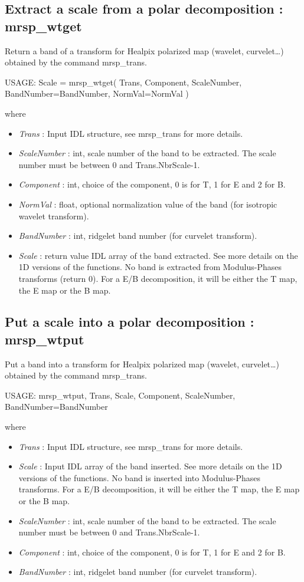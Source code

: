 \subsection{Extract a scale from a polar decomposition : mrsp\_wtget}
Return a band of a transform for Healpix polarized map (wavelet, curvelet\ldots) obtained by the command mrsp\_trans.
{\bf
\begin{center}
     USAGE:  Scale = mrsp\_wtget( Trans, Component, ScaleNumber, BandNumber=BandNumber, NormVal=NormVal )
\end{center}}
where
\begin{itemize}
\item {\em Trans} : Input IDL structure, see mrsp\_trans for more details.
\item {\em ScaleNumber} : int, scale number of the band to be extracted. The scale number must be between 0 and Trans.NbrScale-1.
\item {\em Component} : int, choice of the component, 0 is for T, 1 for E and 2 for B.
\item {\em NormVal} : float, optional normalization value of the band (for isotropic wavelet transform).
\item {\em BandNumber} : int, ridgelet band number (for curvelet transform).
\item {\em Scale} : return value IDL array of the band extracted. See more details on the 1D versions of the functions. 
No band is extracted from Modulus-Phases transforms (return 0). For a E/B decomposition, it will be either the T map, the E map or the B map.
\end{itemize}



\subsection{Put a scale into a polar decomposition : mrsp\_wtput}
Put a band into a transform for Healpix polarized map (wavelet, curvelet\ldots) obtained by the command mrsp\_trans.
{\bf
\begin{center}
     USAGE:   mrsp\_wtput, Trans, Scale, Component, ScaleNumber, BandNumber=BandNumber
\end{center}}
where
\begin{itemize}
\item {\em Trans} : Input IDL structure, see mrsp\_trans for more details.
\item {\em Scale} : Input IDL array of the band inserted. See more details on the 1D versions of the functions. 
No band is inserted into Modulus-Phases transforms. For a E/B decomposition, it will be either the T map, the E map or the B map.
\item {\em ScaleNumber} : int, scale number of the band to be extracted. The scale number must be between 0 and Trans.NbrScale-1.
\item {\em Component} : int, choice of the component, 0 is for T, 1 for E and 2 for B.
\item {\em BandNumber} : int, ridgelet band number (for curvelet transform).
\end{itemize}


